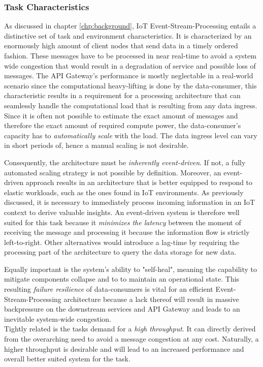 \subsubsection{Task Characteristics}

As discussed in chapter \ref{chp:background}, IoT Event-Stream-Processing entails a distinctive set of task and environment characteristics. It is characterized by an enormously high amount of client nodes that send data in a timely ordered fashion. These messages have to be processed in near real-time to avoid a system wide congestion that would result in a degradation of service and possible loss of messages. The API Gateway's performance is mostly neglectable in a real-world scenario since the computational heavy-lifting is done by the data-consumer, this characteristic results in a requirement for a processing architecture that can seamlessly handle the computational load that is resulting from any data ingress.\\
Since it is often not possible to estimate the exact amount of messages and therefore the exact amount of required compute power, the data-consumer's capacity has to \textit{automatically scale} with the load. The data ingress level can vary in short periods of, hence a manual scaling is not desirable.

Consequently, the architecture must be \textit{inherently event-driven}. If not, a fully automated scaling strategy is not possible by definition. Moreover, an event-driven approach results in an architecture that is better equipped to respond to elastic workloads, such as the ones found in IoT environments. As previously discussed, it is necessary to immediately process incoming information in an IoT context to derive valuable insights. An event-driven system is therefore well suited for this task because it \textit{minimizes the latency} between the moment of receiving the message and processing it because the information flow is strictly left-to-right. Other alternatives would introduce a lag-time by requiring the processing part of the architecture to query the data storage for new data. 

Equally important is the system's ability to "self-heal", meaning the capability to mitigate components collapse and to to maintain an operational state. This resulting \textit{failure resilience} of data-consumers is vital for an efficient Event-Stream-Processing architecture because a lack thereof will result in massive backpressure on the downstream services and API Gateway and leads to an inevitable system-wide congestion.\\
Tightly related is the tasks demand for a \textit{high throughput}. It can directly derived from the overarching need to avoid a message congestion at any cost. Naturally, a higher throughput is desirable and will lead to an increased performance and overall better suited system for the task.

